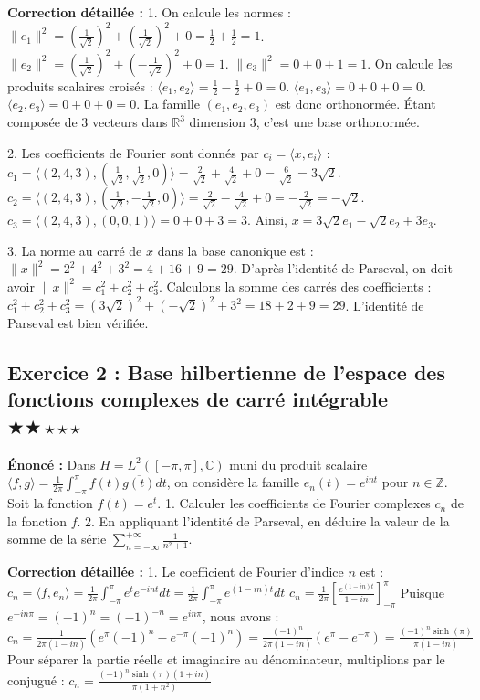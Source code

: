 \documentclass[11pt,a4paper]{article}
\begin{document}
\textbf{Correction détaillée :}
1. On calcule les normes :
   $\|e_1\|^2 = \left(\frac{1}{\sqrt{2}}\right)^2 + \left(\frac{1}{\sqrt{2}}\right)^2 + 0 = \frac{1}{2} + \frac{1}{2} = 1$.
   $\|e_2\|^2 = \left(\frac{1}{\sqrt{2}}\right)^2 + \left(-\frac{1}{\sqrt{2}}\right)^2 + 0 = 1$.
   $\|e_3\|^2 = 0 + 0 + 1 = 1$.
   On calcule les produits scalaires croisés :
   $\langle e_1, e_2 \rangle = \frac{1}{2} - \frac{1}{2} + 0 = 0$.
   $\langle e_1, e_3 \rangle = 0 + 0 + 0 = 0$.
   $\langle e_2, e_3 \rangle = 0 + 0 + 0 = 0$.
   La famille $(e_1, e_2, e_3)$ est donc orthonormée. Étant composée de 3 vecteurs dans $\mathbb{R}^3$ dimension 3, c'est une base orthonormée.

2. Les coefficients de Fourier sont donnés par $c_i = \langle x, e_i \rangle$ :
   $c_1 = \langle (2, 4, 3), \left(\frac{1}{\sqrt{2}}, \frac{1}{\sqrt{2}}, 0\right) \rangle = \frac{2}{\sqrt{2}} + \frac{4}{\sqrt{2}} + 0 = \frac{6}{\sqrt{2}} = 3\sqrt{2}$.
   $c_2 = \langle (2, 4, 3), \left(\frac{1}{\sqrt{2}}, -\frac{1}{\sqrt{2}}, 0\right) \rangle = \frac{2}{\sqrt{2}} - \frac{4}{\sqrt{2}} + 0 = -\frac{2}{\sqrt{2}} = -\sqrt{2}$.
   $c_3 = \langle (2, 4, 3), (0, 0, 1) \rangle = 0 + 0 + 3 = 3$.
   Ainsi, $x = 3\sqrt{2} e_1 - \sqrt{2} e_2 + 3 e_3$.

3. La norme au carré de $x$ dans la base canonique est :
   $\|x\|^2 = 2^2 + 4^2 + 3^2 = 4 + 16 + 9 = 29$.
   D'après l'identité de Parseval, on doit avoir $\|x\|^2 = c_1^2 + c_2^2 + c_3^2$.
   Calculons la somme des carrés des coefficients :
   $c_1^2 + c_2^2 + c_3^2 = (3\sqrt{2})^2 + (-\sqrt{2})^2 + 3^2 = 18 + 2 + 9 = 29$.
   L'identité de Parseval est bien vérifiée.


\subsection*{Exercice 2 : Base hilbertienne de l'espace des fonctions complexes de carré intégrable $\bigstar\bigstar\star\star\star$}

\textbf{Énoncé :}
Dans $H = L^2([-\pi, \pi], \mathbb{C})$ muni du produit scalaire $\langle f, g \rangle = \frac{1}{2\pi} \int_{-\pi}^\pi f(t) \overline{g(t)} dt$, on considère la famille $e_n(t) = e^{int}$ pour $n \in \mathbb{Z}$.
Soit la fonction $f(t) = e^t$.
1. Calculer les coefficients de Fourier complexes $c_n$ de la fonction $f$.
2. En appliquant l'identité de Parseval, en déduire la valeur de la somme de la série $\sum_{n=-\infty}^{+\infty} \frac{1}{n^2 + 1}$.

\textbf{Correction détaillée :}
1. Le coefficient de Fourier d'indice $n$ est :
   $c_n = \langle f, e_n \rangle = \frac{1}{2\pi} \int_{-\pi}^\pi e^t e^{-int} dt = \frac{1}{2\pi} \int_{-\pi}^\pi e^{(1-in)t} dt$
   $c_n = \frac{1}{2\pi} \left[ \frac{e^{(1-in)t}}{1-in} \right]_{-\pi}^\pi$
   Puisque $e^{-in\pi} = (-1)^n = (-1)^{-n} = e^{in\pi}$, nous avons :
   $c_n = \frac{1}{2\pi(1-in)} (e^\pi (-1)^n - e^{-\pi} (-1)^n) = \frac{(-1)^n}{2\pi(1-in)} (e^\pi - e^{-\pi}) = \frac{(-1)^n \sinh(\pi)}{\pi(1-in)}$
   Pour séparer la partie réelle et imaginaire au dénominateur, multiplions par le conjugué :
   $c_n = \frac{(-1)^n \sinh(\pi) (1+in)}{\pi(1+n^2)}$
\end{document}
